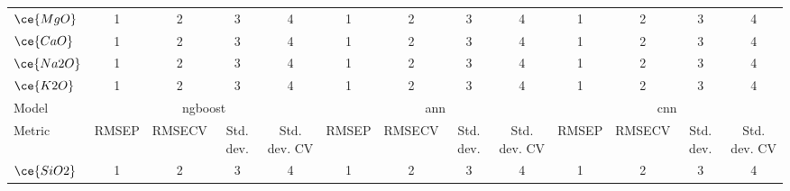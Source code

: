 \begin{table*}[]
{\begin{tabular}{l|cccc|cccc|cccc}
$\ce{MgO}$   & \multicolumn{1}{c}{1}     & \multicolumn{1}{c}{2}           & \multicolumn{1}{c}{3}       & \multicolumn{1}{c|}{4}            & \multicolumn{1}{c}{1}     & \multicolumn{1}{c}{2}           & \multicolumn{1}{c}{3}       & \multicolumn{1}{c|}{4}            & \multicolumn{1}{c}{1}     & \multicolumn{1}{c}{2}           & \multicolumn{1}{c}{3}       & 4                             \\
$\ce{CaO}$   & \multicolumn{1}{c}{1}     & \multicolumn{1}{c}{2}           & \multicolumn{1}{c}{3}       & \multicolumn{1}{c|}{4}            & \multicolumn{1}{c}{1}     & \multicolumn{1}{c}{2}           & \multicolumn{1}{c}{3}       & \multicolumn{1}{c|}{4}            & \multicolumn{1}{c}{1}     & \multicolumn{1}{c}{2}           & \multicolumn{1}{c}{3}       & 4                             \\
$\ce{Na2O}$  & \multicolumn{1}{c}{1}     & \multicolumn{1}{c}{2}           & \multicolumn{1}{c}{3}       & \multicolumn{1}{c|}{4}            & \multicolumn{1}{c}{1}     & \multicolumn{1}{c}{2}           & \multicolumn{1}{c}{3}       & \multicolumn{1}{c|}{4}            & \multicolumn{1}{c}{1}     & \multicolumn{1}{c}{2}           & \multicolumn{1}{c}{3}       & 4                             \\
$\ce{K2O}$   & \multicolumn{1}{c}{1}     & \multicolumn{1}{c}{2}           & \multicolumn{1}{c}{3}       & \multicolumn{1}{c|}{4}            & \multicolumn{1}{c}{1}     & \multicolumn{1}{c}{2}           & \multicolumn{1}{c}{3}       & \multicolumn{1}{c|}{4}            & \multicolumn{1}{c}{1}     & \multicolumn{1}{c}{2}           & \multicolumn{1}{c}{3}       & 4                             \\
\hline
Model        & \multicolumn{4}{c|}{\gls{ngboost}} & \multicolumn{4}{c|}{\gls{ann}} & \multicolumn{4}{c}{\gls{cnn}} \\
Metric       & \multicolumn{1}{c}{RMSEP} & \multicolumn{1}{c}{RMSECV} & \multicolumn{1}{c}{Std. dev.} & \multicolumn{1}{c|}{Std. dev. CV} & \multicolumn{1}{c}{RMSEP} & \multicolumn{1}{c}{RMSECV} & \multicolumn{1}{c}{Std. dev.} & \multicolumn{1}{c|}{Std. dev. CV} & \multicolumn{1}{c}{RMSEP} & \multicolumn{1}{c}{RMSECV} & \multicolumn{1}{c}{Std. dev.} & \multicolumn{1}{c}{Std. dev. CV} \\
\hline
$\ce{SiO2}$  & \multicolumn{1}{c}{1}     & \multicolumn{1}{c}{2}           & \multicolumn{1}{c}{3}       & \multicolumn{1}{c|}{4}            & \multicolumn{1}{c}{1}     & \multicolumn{1}{c}{2}           & \multicolumn{1}{c}{3}       & \multicolumn{1}{c|}{4}            & \multicolumn{1}{c}{1}     & \multicolumn{1}{c}{2}           & \multicolumn{1}{c}{3}       & 4                             \\

\end{tabular}}
\end{table*}

